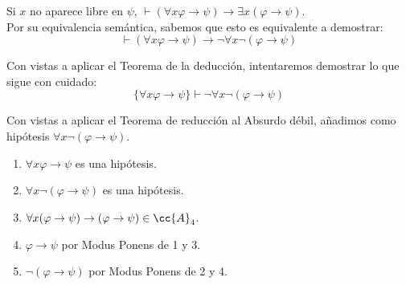 \begin{ejercicio}\label{ej:2.11}
    Si $x$ no aparece libre en $\psi$, $\vdash (\forall x \varphi \rightarrow \psi) \rightarrow \exists x(\varphi \rightarrow \psi)$.\\

    Por su equivalencia semántica, sabemos que esto es equivalente a demostrar:
    \begin{equation*}
        \vdash (\forall x \varphi \rightarrow \psi) \rightarrow \neg\forall x \neg(\varphi \rightarrow \psi)
    \end{equation*}

    Con vistas a aplicar el Teorema de la deducción, intentaremos demostrar lo que sigue con cuidado:
    \begin{equation*}
        \{\forall x \varphi \rightarrow \psi\} \vdash \neg\forall x \neg(\varphi \rightarrow \psi)
    \end{equation*}

    Con vistas a aplicar el Teorema de reducción al Absurdo débil, añadimos como hipótesis $\forall x \neg(\varphi \rightarrow \psi)$.
    \begin{enumerate}
        \item $\forall x \varphi \rightarrow \psi$ es una hipótesis.
        \item $\forall x \neg(\varphi \rightarrow \psi)$ es una hipótesis.
        \item $\forall x(\varphi \rightarrow \psi) \rightarrow (\varphi \rightarrow \psi)\in \cc{A}_4$.
        \item $\varphi\rightarrow\psi$ por Modus Ponens de 1 y 3.
        \item $\neg(\varphi\rightarrow\psi)$ por Modus Ponens de 2 y 4.
    \end{enumerate}
\end{ejercicio}